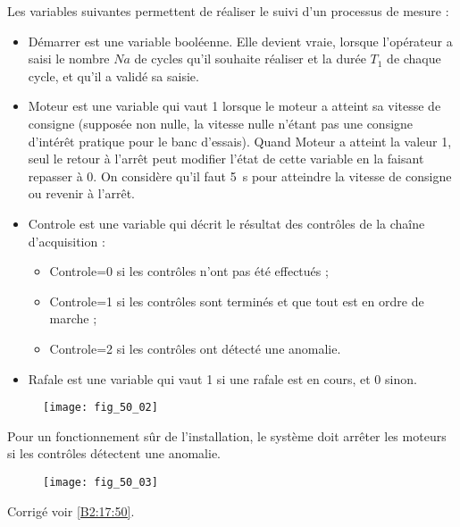 Les variables suivantes permettent de réaliser le suivi d’un processus de mesure :
\begin{itemize}
\item Démarrer est une variable booléenne. Elle devient vraie, lorsque l’opérateur a saisi
le nombre $Na$ de cycles qu’il souhaite réaliser et la durée $T_1$ de chaque cycle, et
qu’il a validé sa saisie.
\item Moteur est une variable qui vaut 1 lorsque le moteur a atteint sa vitesse de consigne
(supposée non nulle, la vitesse nulle n’étant pas une consigne d’intérêt pratique
pour le banc d’essais). Quand Moteur a atteint la valeur 1, seul le retour à l’arrêt
peut modifier l’état de cette variable en la faisant repasser à 0. On considère qu’il
faut \SI{5}{s} pour atteindre la vitesse de consigne ou revenir à l’arrêt.
\item Controle est une variable qui décrit le résultat des contrôles de la chaîne d’acquisition
:
\begin{itemize}
\item Controle=0 si les contrôles n’ont pas été effectués ;
\item Controle=1 si les contrôles sont terminés et que tout est en ordre de marche ;
\item Controle=2 si les contrôles ont détecté une anomalie.
\end{itemize}
\item Rafale est une variable qui vaut 1 si une rafale est en cours, et 0 sinon.
\end{itemize}










\begin{figure}[H]
\centering
\texttt{[image: fig\_50\_02]}
\end{figure}

\ifprof
\else
\fi

Pour un fonctionnement sûr de l’installation, le système doit arrêter les moteurs si les
contrôles détectent une anomalie.


\begin{figure}[H]
\centering
\texttt{[image: fig\_50\_03]}
\end{figure}

\ifprof
\else
\fi



\ifprof
\else
\begin{flushright}
\footnotesize{Corrigé  voir \ref{B2:17:50}.}
\end{flushright}%
\fi